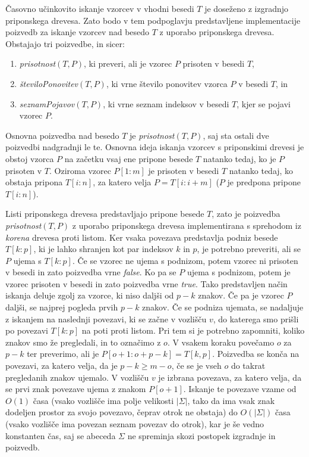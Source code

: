 Časovno učinkovito iskanje vzorcev v vhodni besedi $T$ je doseženo z izgradnjo priponskega drevesa. Zato bodo v tem podpoglavju predstavljene implementacije poizvedb za iskanje vzorcev nad besedo $T$ z uporabo priponskega drevesa. Obstajajo tri poizvedbe, in sicer:
\begin{enumerate}
    \item \textit{prisotnost}$(T,P)$, ki preveri, ali je vzorec $P$ prisoten v besedi $T$,
    \item \textit{številoPonovitev}$(T,P)$, ki vrne število ponovitev vzorca $P$ v besedi $T$, in
    \item \textit{seznamPojavov}$(T,P)$, ki vrne seznam indeksov v besedi $T$, kjer se pojavi vzorec $P$.
\end{enumerate}

Osnovna poizvedba nad besedo $T$ je \textit{prisotnost}$(T,P)$, saj sta ostali dve poizvedbi nadgradnji le te. Osnovna ideja iskanja vzorcev s priponskimi drevesi je obstoj vzorca $P$ na začetku vsaj ene pripone besede $T$ natanko tedaj, ko je $P$ prisoten v $T$. Oziroma vzorec $P[1:m]$ je prisoten v besedi $T$ natanko tedaj, ko obstaja pripona $T[i:n]$, za katero velja $P=T[i:i+m]$ ($P$ je predpona pripone $T[i:n]$). 

Listi priponskega drevesa predstavljajo pripone besede $T$, zato je poizvedba \textit{prisotnost}$(T,P)$ z uporabo priponskega drevesa implementirana s sprehodom iz \textit{korena} drevesa proti listom. Ker vsaka povezava predstavlja podniz besede $T[k:p]$, ki je lahko shranjen kot par indeksov $k$ in $p$, je potrebno preveriti, ali se $P$ ujema s $T[k:p]$. Če se vzorec ne ujema s podnizom, potem vzorec ni prisoten v besedi in zato poizvedba vrne \textit{false}. Ko pa se $P$ ujema s podnizom, potem je vzorec prisoten v besedi in zato poizvedba vrne \textit{true}. Tako predstavljen način iskanja deluje zgolj za vzorce, ki niso daljši od $p-k$ znakov. Če pa je vzorec $P$ daljši, se najprej pogleda prvih $p-k$ znakov. Če se podniza ujemata, se nadaljuje z iskanjem na naslednji povezavi, ki se začne v vozlišču $v$, do katerega smo prišli po povezavi $T[k:p]$ na poti proti listom. Pri tem si je potrebno zapomniti, koliko znakov smo že pregledali, in to označimo z $o$. V vsakem koraku povečamo $o$ za $p-k$ ter preverimo, ali je $P[o+1:o+p-k]=T[k,p]$. Poizvedba se konča na povezavi, za katero velja, da je $p-k\ge m-o$, če se je vseh $o$ do takrat pregledanih znakov ujemalo. V vozlišču $v$ je izbrana povezava, za katero velja, da se prvi znak povezave ujema z znakom $P[o+1]$. Iskanje te povezave vzame od $O(1)$ časa (vsako vozlišče ima polje velikosti $|\Sigma|$, tako da ima vsak znak dodeljen prostor za svojo povezavo, čeprav otrok ne obstaja) do $O(|\Sigma|)$ časa (vsako vozlišče ima povezan seznam povezav do otrok), kar je še vedno konstanten čas, saj se abeceda $\Sigma$ ne spreminja skozi postopek izgradnje in poizvedb.


